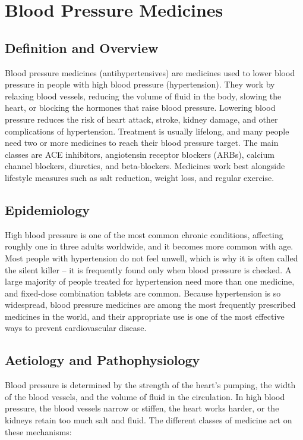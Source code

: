 \chapter{Blood Pressure Medicines}

\section*{Definition and Overview}
Blood pressure medicines (antihypertensives) are medicines used to lower blood pressure in people with high blood pressure (hypertension). They work by relaxing blood vessels, reducing the volume of fluid in the body, slowing the heart, or blocking the hormones that raise blood pressure. Lowering blood pressure reduces the risk of heart attack, stroke, kidney damage, and other complications of hypertension. Treatment is usually lifelong, and many people need two or more medicines to reach their blood pressure target. The main classes are ACE inhibitors, angiotensin receptor blockers (ARBs), calcium channel blockers, diuretics, and beta-blockers. Medicines work best alongside lifestyle measures such as salt reduction, weight loss, and regular exercise.

\section*{Epidemiology}
High blood pressure is one of the most common chronic conditions, affecting roughly one in three adults worldwide, and it becomes more common with age. Most people with hypertension do not feel unwell, which is why it is often called the silent killer -- it is frequently found only when blood pressure is checked. A large majority of people treated for hypertension need more than one medicine, and fixed-dose combination tablets are common. Because hypertension is so widespread, blood pressure medicines are among the most frequently prescribed medicines in the world, and their appropriate use is one of the most effective ways to prevent cardiovascular disease.

\section*{Aetiology and Pathophysiology}
Blood pressure is determined by the strength of the heart's pumping, the width of the blood vessels, and the volume of fluid in the circulation. In high blood pressure, the blood vessels narrow or stiffen, the heart works harder, or the kidneys retain too much salt and fluid. The different classes of medicine act on these mechanisms:

